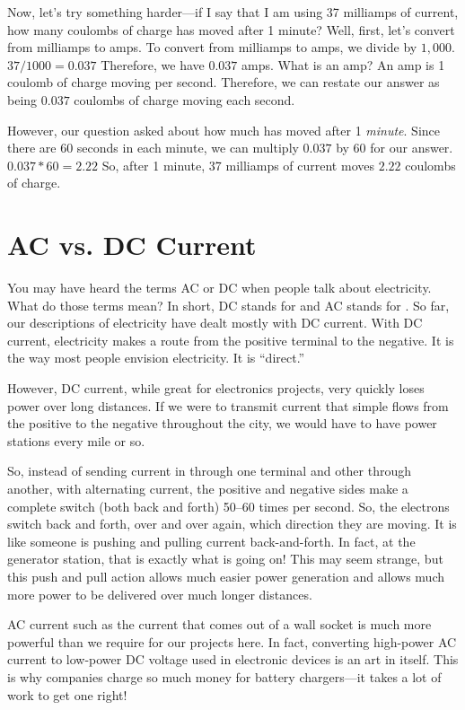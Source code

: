 \begin{exampleprob}
Now, let's try something harder---if I say that I am using 37 milliamps of current, how many coulombs of charge has moved after 1 minute?
Well, first, let's convert from milliamps to amps.  
To convert from milliamps to amps, we divide by $1,000$.
$37 / 1000 = 0.037$
Therefore, we have $0.037$ amps.
What is an amp?
An amp is 1 coulomb of charge moving per second.
Therefore, we can restate our answer as being $0.037$ coulombs of charge moving each second.

However, our question asked about how much has moved after 1 \emph{minute}.
Since there are $60$ seconds in each minute, we can multiply $0.037$ by $60$ for our answer.
$0.037 * 60 = 2.22$
So, after 1 minute, 37 milliamps of current moves $2.22$ coulombs of charge.
\end{exampleprob}

\section{AC vs. DC Current}

You may have heard the terms AC or DC when people talk about electricity.
What do those terms mean?
In short, DC stands for  and AC stands for .
So far, our descriptions of electricity have dealt mostly with DC current.
With DC current, electricity makes a route from the positive terminal to the negative.
It is the way most people envision electricity.
It is ``direct.''

However, DC current, while great for electronics projects, very quickly loses power over long distances.
If we were to transmit current that simple flows from the positive to the negative throughout the city, we would have to have power stations every mile or so.

So, instead of sending current in through one terminal and other through another, with alternating current, the positive and negative sides make a complete switch (both back and forth) 50--60 times per second.
So, the electrons switch back and forth, over and over again, which direction they are moving.
It is like someone is pushing and pulling current back-and-forth.
In fact, at the generator station, that is exactly what is going on!
This may seem strange, but this push and pull action allows much easier power generation and allows much more power to be delivered over much longer distances.

AC current such as the current that comes out of a wall socket is much more powerful than we require for our projects here.
In fact, converting high-power AC current to low-power DC voltage used in electronic devices is an art in itself.
This is why companies charge so much money for battery chargers---it takes a lot of work to get one right!

